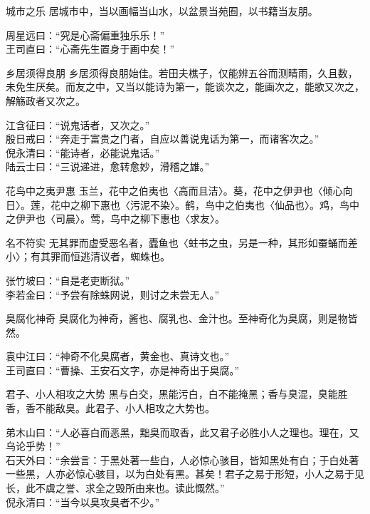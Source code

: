 \begin{yulu}{城市之乐}
居城市中，当以画幅当山水，以盆景当苑囿，以书籍当友朋。
\begin{comments}
周星远曰：“究是心斋偏重独乐乐！” \\
王司直曰：“心斋先生置身于画中矣！”
\end{comments}
\end{yulu}

\begin{yulu}{乡居须得良朋}
乡居须得良朋始佳。若田夫樵子，仅能辨五谷而测晴雨，久且数，未免生厌矣。而友之中，又当以能诗为第一，能谈次之，能画次之，能歌又次之，解觞政者又次之。
\begin{comments}
江含征曰：“说鬼话者，又次之。” \\
殷日戒曰：“奔走于富贵之门者，自应以善说鬼话为第一，而诸客次之。” \\
倪永清曰：“能诗者，必能说鬼话。” \\
陆云士曰：“三说递进，愈转愈妙，滑稽之雄。”
\end{comments}
\end{yulu}

\begin{yulu}{花鸟中之夷尹惠}
玉兰，花中之伯夷也〈高而且洁〉。葵，花中之伊尹也〈倾心向日〉。莲，花中之柳下惠也〈污泥不染〉。鹤，鸟中之伯夷也〈仙品也〉。鸡，鸟中之伊尹也〈司晨〉。莺，鸟中之柳下惠也〈求友〉。
\begin{comments}

\end{comments}
\end{yulu}

\begin{yulu}{名不符实}
无其罪而虚受恶名者，蠹鱼也〈蛀书之虫，另是一种，其形如蚕蛹而差小〉；有其罪而恒逃清议者，蜘蛛也。
\begin{comments}
张竹坡曰：“自是老吏断狱。” \\
李若金曰：“予尝有除蛛网说，则讨之未尝无人。”
\end{comments}
\end{yulu}

\begin{yulu}{臭腐化神奇}
臭腐化为神奇，酱也、腐乳也、金汁也。至神奇化为臭腐，则是物皆然。
\begin{comments}
袁中江曰：“神奇不化臭腐者，黄金也、真诗文也。” \\
王司直曰：“曹操、王安石文字，亦是神奇出于臭腐。”
\end{comments}
\end{yulu}

\begin{yulu}{君子、小人相攻之大势}
黑与白交，黑能污白，白不能掩黑；香与臭混，臭能胜香，香不能敌臭。此君子、小人相攻之大势也。
\begin{comments}
弟木山曰：“人必喜白而恶黑，黜臭而取香，此又君子必胜小人之理也。理在，又乌论乎势！” \\
石天外曰：“余尝言：于黑处著一些白，人必惊心骇目，皆知黑处有白；于白处著一些黑，人亦必惊心骇目，以为白处有黑。甚矣！君子之易于形短，小人之易于见长，此不虞之誉、求全之毁所由来也。读此慨然。” \\
倪永清曰：“当今以臭攻臭者不少。”
\end{comments}
\end{yulu}

